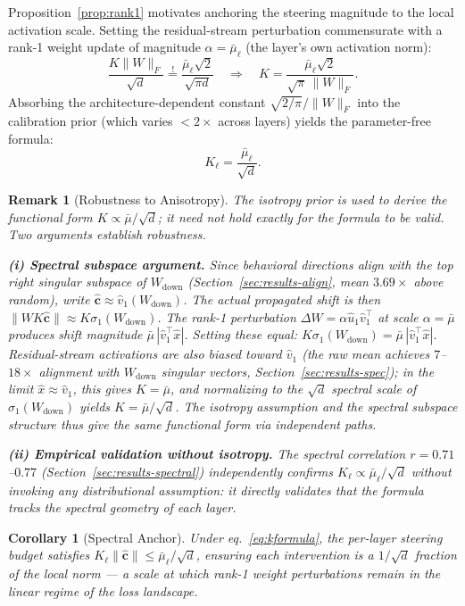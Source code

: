 \documentclass{article}
\newtheorem{corollary}{Corollary}[proposition]
\newtheorem{remark}{Remark}
\newcommand{\ch}{\hat{\mathbf{c}}}
\newcommand{\mubar}{\bar{\mu}}
\newcommand{\sone}{\sigma_1}
\newcommand{\Wdn}{W_{\!\mathrm{down}}}
\begin{document}
Proposition~\ref{prop:rank1} motivates anchoring the steering magnitude to the local
activation scale.
Setting the residual-stream perturbation commensurate with a rank-1 weight update of
magnitude $\alpha = \mubar_\ell$ (the layer's own activation norm):
\[
  \frac{K\|W\|_F}{\sqrt{d}} \stackrel{!}{=} \frac{\mubar_\ell\sqrt{2}}{\sqrt{\pi d}}
  \quad\Longrightarrow\quad
  K = \frac{\mubar_\ell\sqrt{2}}{\sqrt{\pi}\,\|W\|_F}.
\]
Absorbing the architecture-dependent constant $\sqrt{2/\pi}/\|W\|_F$ into the
calibration prior (which varies $<\!2\times$ across layers) yields the parameter-free
formula:
\begin{equation}
  K_\ell = \frac{\mubar_\ell}{\sqrt{d}}.
  \label{eq:kformula}
\end{equation}
\begin{remark}[Robustness to Anisotropy]
\label{rem:aniso}
The isotropy prior is used to derive the \emph{functional form} $K \propto \mubar/\sqrt{d}$;
it need not hold exactly for the formula to be valid.
Two arguments establish robustness.

\textbf{(i) Spectral subspace argument.}
Since behavioral directions align with the top right singular subspace of $\Wdn$
(Section~\ref{sec:results-align}, mean $3.69\times$ above random), write
$\ch \approx \hat{v}_1(\Wdn)$.
The actual propagated shift is then $\|WK\ch\| \approx K\sone(\Wdn)$.
The rank-1 perturbation $\Delta W = \alpha\hat{u}_1\hat{v}_1^\top$ at scale $\alpha = \mubar$
produces shift magnitude $\mubar\,|\hat{v}_1^\top\hat{x}|$.
Setting these equal: $K\sone(\Wdn) = \mubar\,|\hat{v}_1^\top\hat{x}|$.
Residual-stream activations are also biased toward $\hat{v}_1$ (the raw mean achieves
$7$--$18\times$ alignment with $\Wdn$ singular vectors, Section~\ref{sec:results-spec});
in the limit $\hat{x} \approx \hat{v}_1$, this gives $K = \mubar$, and normalizing to the
$\sqrt{d}$ spectral scale of $\sone(\Wdn)$ yields $K = \mubar/\sqrt{d}$.
The isotropy assumption and the spectral subspace structure thus give the \emph{same}
functional form via independent paths.

\textbf{(ii) Empirical validation without isotropy.}
The spectral correlation $r{=}0.71$--$0.77$ (Section~\ref{sec:results-spectral}) independently
confirms $K_\ell \propto \mubar_\ell/\sqrt{d}$ without invoking any distributional
assumption: it directly validates that the formula tracks the spectral geometry of each
layer.
\end{remark}

\begin{corollary}[Spectral Anchor]
\label{cor:anchor}
Under eq.~\eqref{eq:kformula}, the per-layer steering budget satisfies
$K_\ell\|\ch\| \leq \mubar_\ell/\sqrt{d}$, ensuring each intervention is a
$1/\sqrt{d}$ fraction of the local norm — a scale at which rank-1 weight
perturbations remain in the linear regime of the loss landscape.
\end{corollary}
\end{document}
